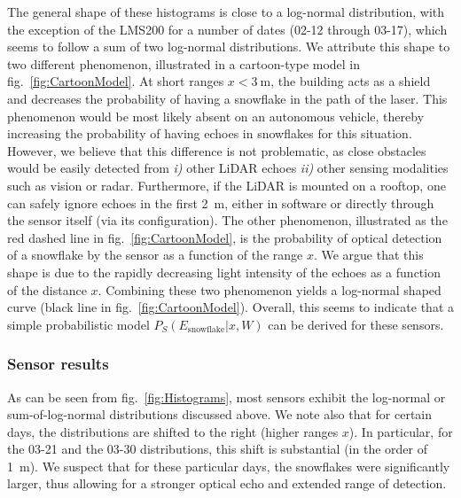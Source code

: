 The general shape of these histograms is close to a log-normal distribution, with the exception of the LMS200 for a number of dates (02-12 through 03-17), which seems to follow a sum of two log-normal distributions. We attribute this shape to two different phenomenon, illustrated in a cartoon-type model in fig.~\ref{fig:CartoonModel}. At short ranges $x<\SI{3}{\meter}$, the building acts as a shield and decreases the probability of having a snowflake in the path of the laser. This phenomenon would be most likely absent on an autonomous vehicle, thereby increasing the probability of having echoes in snowflakes for this situation. However, we believe that this difference is not problematic, as close obstacles would be easily detected from \emph{i)} other LiDAR echoes \emph{ii)} other sensing modalities such as vision or radar. Furthermore, if the LiDAR is mounted on a rooftop, one can safely  ignore echoes in the first \SI{2}{\meter}, either in software or directly through the sensor itself (via its configuration). The other phenomenon, illustrated as the red dashed line in fig.~\ref{fig:CartoonModel}, is the probability of optical detection of a snowflake by the sensor as a function of the range $x$. We argue that this shape is due to the rapidly decreasing light intensity of the echoes as a function of the distance $x$. Combining these two phenomenon yields a log-normal shaped curve (black line in fig.~\ref{fig:CartoonModel}). Overall, this seems to indicate that a simple probabilistic model $P_S(E_\text{snowflake}|x,W)$ can be derived for these sensors. 


\subsubsection{Sensor results}
As can be seen from fig.~\ref{fig:Histograms}, most sensors exhibit the log-normal or sum-of-log-normal distributions discussed above. We note also that for certain days, the distributions are shifted to the right (higher ranges $x$). In particular, for the 03-21 and the 03-30 distributions, this shift is substantial (in the order of \SI{1}{\meter}). We suspect that for these particular days, the snowflakes were significantly larger, thus allowing for a stronger optical echo and extended range of detection. 

